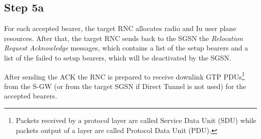 \subsection*{Step 5a}
For each accepted bearer, the target RNC allocates radio and Iu
user plane resources. After that, the target RNC sends back to the SGSN the
\emph{Relocation Request Acknowledge} messages, which contains a list of the
setup bearers and a list of the failed to setup bearers, which will be deactivated
by the SGSN.

After sending the ACK the RNC is prepared to receive downlink GTP
PDUs\footnote{Packets received by a protocol layer are called Service Data Unit
(SDU) while packets output of a layer are called Protocol Data Unit (PDU).}
from the S-GW (or from the target SGSN if Direct Tunnel is not used) for the
accepted bearers.



